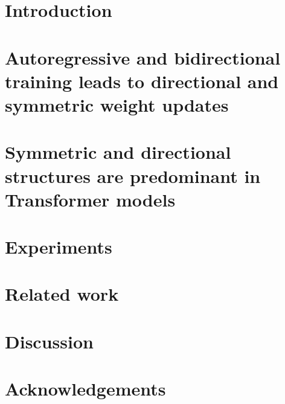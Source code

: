 \documentclass{article}
\theoremstyle{plain}
\theoremstyle{definition}
\theoremstyle{remark}
\begin{document}
\printAffiliationsAndNotice{\icmlEqualContribution} %

\begin{abstract}

\end{abstract}

\section{Introduction}
\label{sec-introduction}


\section{Autoregressive and bidirectional training leads to directional and symmetric weight updates}
\label{sec-results-math}

%


\section{Symmetric and directional structures are predominant in Transformer models}
\label{sec-results-pretrained-models}


%

\section{Experiments}
\label{sec–results–experiments}


\section{Related work}
\label{sec-related-work}


\section{Discussion}
\label{sec–discussion}



\newpage
\section*{Acknowledgements}
\end{document}
